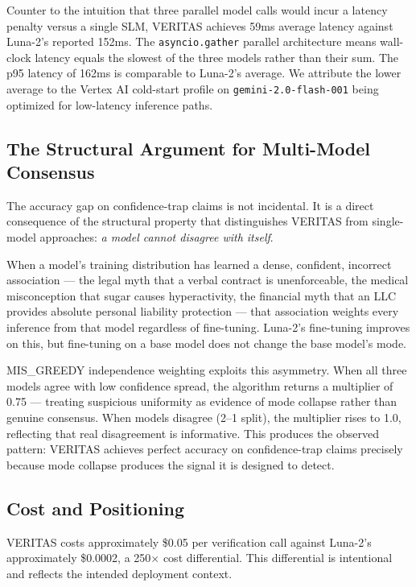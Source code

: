 Counter to the intuition that three parallel model calls would
incur a latency penalty versus a single SLM, VERITAS achieves
59ms average latency against Luna-2's reported 152ms. The
\texttt{asyncio.gather} parallel architecture means wall-clock
latency equals the slowest of the three models rather than
their sum. The p95 latency of 162ms is comparable to Luna-2's
average. We attribute the lower average to the Vertex AI
cold-start profile on \texttt{gemini-2.0-flash-001} being optimized
for low-latency inference paths.

\subsection{The Structural Argument for Multi-Model Consensus}

The accuracy gap on confidence-trap claims is not incidental.
It is a direct consequence of the structural property that
distinguishes VERITAS from single-model approaches:
\textit{a model cannot disagree with itself}.

When a model's training distribution has learned a dense,
confident, incorrect association --- the legal myth that a verbal
contract is unenforceable, the medical misconception that sugar
causes hyperactivity, the financial myth that an LLC provides
absolute personal liability protection --- that association weights
every inference from that model regardless of fine-tuning.
Luna-2's fine-tuning improves on this, but fine-tuning
on a base model does not change the base model's mode.

MIS\_GREEDY independence weighting exploits this asymmetry.
When all three models agree with low confidence spread,
the algorithm returns a multiplier of 0.75 --- treating
suspicious uniformity as evidence of mode collapse rather
than genuine consensus. When models disagree (2--1 split),
the multiplier rises to 1.0, reflecting that real disagreement
is informative. This produces the observed pattern: VERITAS
achieves perfect accuracy on confidence-trap claims precisely
because mode collapse produces the signal it is designed to detect.

\subsection{Cost and Positioning}

VERITAS costs approximately \$0.05 per verification call against
Luna-2's approximately \$0.0002, a 250$\times$ cost differential.
This differential is intentional and reflects the intended deployment context.

